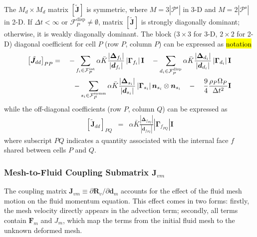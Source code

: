 \documentclass[sn-mathphys,Numbered]{sn-jnl}%
\newcommand{\bb}{\boldsymbol}
\begin{document}
The $M_d \times M_d$ matrix $\left[ \bb{\tilde{J}} \right]$ is symmetric, where $M = 3|\mathcal{P^s}|$ in 3-D and $M = 2|\mathcal{P^s}|$ in 2-D.
If $\Delta t < \infty$ or $\mathcal{F}^{\text{disp}}_P \neq \emptyset$, matrix $\left[ \bb{\tilde{J}} \right]$ is strongly diagonally dominant; otherwise, it is weakly diagonally dominant.
The block ($3\times3$ for 3-D, $2\times2$ for 2-D) diagonal coefficient for cell $P$ (row $P$, column $P$) can be expressed as \hl{notation}
\begin{eqnarray}
	 \left[ \tilde{\bb{J}}_{dd} \right]_{PP} &=&
		- \sum_{f_i \in \mathcal{F}^{\text{int}}_P}  \alpha \bar{K}
		\frac{ \left|\bb{\Delta}_{f_i} \right| }{\left|\bb{d}_{f_i}\right|}    \left|\bb{\Gamma}_{f_i}\right| \textbf{I} 
	    \quad-  \sum_{d_i \in \mathcal{F}^{\text{disp}}_P}  \alpha \bar{K}
		 \frac{ \left|\bb{\Delta}_{d_i} \right| }{\left|\bb{d}_{d_i}\right|} 
		\left|\bb{\Gamma}_{d_i}\right| \textbf{I} \notag \\
	 &&\quad - \sum_{s_i \in \mathcal{F}^{\text{symm}}_P} \alpha \bar{K}
		 \frac{ \left|\bb{\Delta}_{s_i} \right|}{\left|\bb{d}_{s_i}\right|}
		\left|\bb{\Gamma}_{s_i}\right|  \bb{n}_{s_i} \otimes \bb{n}_{s_i} 
	\quad - \quad \frac{9}{4}  \frac{\rho_P \Omega_P}{\Delta t^2} \textbf{I}
\end{eqnarray}
while the off-diagonal coefficients (row $P$, column $Q$) can be expressed as
\begin{eqnarray}
	\left[\tilde{\bb{J}}_{dd} \right] _{PQ} &=&
		\alpha \bar{K} \frac{ \left|\bb{\Delta}_{f_{PQ}} \right| }{\left|\bb{d}_{f_{PQ}}\right|} \left|\bb{\Gamma}_{f_{PQ}}\right| \textbf{I} 
\end{eqnarray}
where subscript $PQ$ indicates a quantity associated with the internal face $f$ shared between cells $P$ and $Q$.



\subsubsection[Mesh-to-Fluid Coupling Submatrix]{Mesh-to-Fluid Coupling Submatrix $\bb{J}_{vm}$} %
The coupling matrix $\bb{J}_{vm} \equiv \partial \bb{R}_{v}/\partial \bb{d}_m$ accounts for the effect of the fluid mesh motion on the fluid momentum equation.
This effect comes in two forms: firstly, the mesh velocity directly appears in the advection term; secondly, all terms contain $\bb{F}_m$ and $J_m$, which map the terms from the initial fluid mesh to the unknown deformed mesh.
\end{document}
